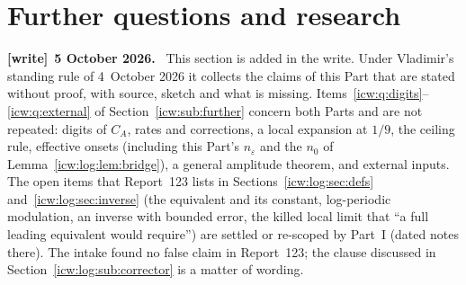 \documentclass[11pt,letterpaper]{article}
\theoremstyle{remark}\newtheorem{remark}[theorem]{Remark}
\newcommand{\eps}{\varepsilon}
\newcommand{\1}{\mathbf1}
\newenvironment{writenote}[1][]{\par\smallskip\begingroup\small
 \noindent\textbf{[write]}\if\relax\detokenize{#1}\relax\else~\textbf{#1.}\fi\ }%
 {\par\endgroup\smallskip}
\begin{document}
\section{Further questions and research}\label{icw:log:sec:further}
\begin{writenote}[5 October 2026]
This section is added in the write. Under Vladimir's standing rule of 4~October 2026 it collects the claims of this Part that are stated without proof, with source, sketch and what is missing. Items~\ref{icw:q:digits}--\ref{icw:q:external} of Section~\ref{icw:sub:further} concern both Parts and are not repeated: digits of $C_A$, rates and corrections, a local expansion at $1/9$, the ceiling rule, effective onsets (including this Part's $n_\eps$ and the $n_0$ of Lemma~\ref{icw:log:lem:bridge}), a general amplitude theorem, and external inputs. The open items that Report~123 lists in Sections~\ref{icw:log:sec:defs} and~\ref{icw:log:sec:inverse} (the equivalent and its constant, log-periodic modulation, an inverse with bounded error, the killed local limit that ``a full leading equivalent would require'') are settled or re-scoped by Part~I (dated notes there). The intake found no false claim in Report~123; the clause discussed in Section~\ref{icw:log:sub:corrector} is a matter of wording.
\end{writenote}
\end{document}
